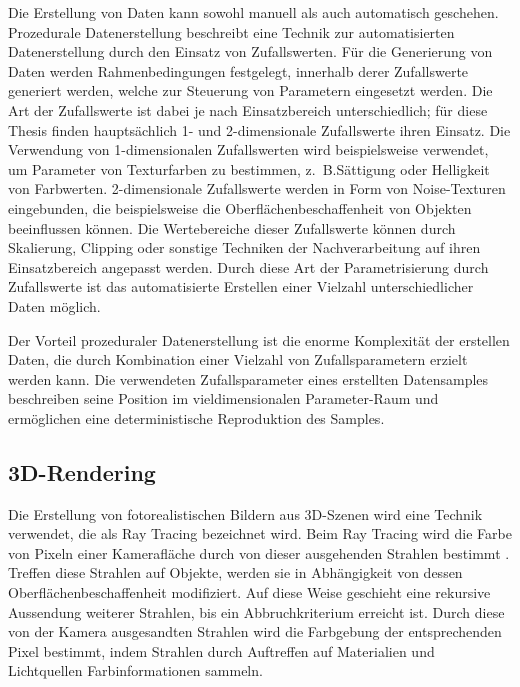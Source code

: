 Die Erstellung von Daten kann sowohl manuell als auch automatisch geschehen. Prozedurale Datenerstellung beschreibt eine Technik zur automatisierten Datenerstellung durch den Einsatz von Zufallswerten. Für die Generierung von Daten werden Rahmenbedingungen festgelegt, innerhalb derer Zufallswerte generiert werden, welche zur Steuerung von Parametern eingesetzt werden. Die Art der Zufallswerte ist dabei je nach Einsatzbereich unterschiedlich; für diese Thesis finden hauptsächlich 1- und 2-dimensionale Zufallswerte ihren Einsatz. Die Verwendung von 1-dimensionalen Zufallswerten wird beispielsweise verwendet, um Parameter von Texturfarben zu bestimmen, z.~B.Sättigung oder Helligkeit von Farbwerten. 2-dimensionale Zufallswerte werden in Form von Noise-Texturen eingebunden, die beispielsweise die Oberflächenbeschaffenheit von Objekten beeinflussen können. Die Wertebereiche dieser Zufallswerte können durch Skalierung, Clipping oder sonstige Techniken der Nachverarbeitung auf ihren Einsatzbereich angepasst werden. Durch diese Art der Parametrisierung durch Zufallswerte ist das automatisierte Erstellen einer Vielzahl unterschiedlicher Daten möglich.

Der Vorteil prozeduraler Datenerstellung ist die enorme Komplexität der erstellen Daten, die durch Kombination einer Vielzahl von Zufallsparametern erzielt werden kann. Die verwendeten Zufallsparameter eines erstellten Datensamples beschreiben seine Position im vieldimensionalen Parameter-Raum und ermöglichen eine deterministische Reproduktion des Samples.



\subsection{3D-Rendering}
\label{sec:3d_rendering}

Die Erstellung von fotorealistischen Bildern aus 3D-Szenen wird eine Technik verwendet, die als Ray Tracing bezeichnet wird. Beim Ray Tracing wird die Farbe von Pixeln einer Kamerafläche durch von dieser ausgehenden Strahlen bestimmt \cite{ray_tracing,ray_tracing_distributed,ray_tracing_equations}. Treffen diese Strahlen auf Objekte, werden sie in Abhängigkeit von dessen Oberflächenbeschaffenheit modifiziert. Auf diese Weise geschieht eine rekursive Aussendung weiterer Strahlen, bis ein Abbruchkriterium erreicht ist. Durch diese von der Kamera ausgesandten Strahlen wird die Farbgebung der entsprechenden Pixel bestimmt, indem Strahlen durch Auftreffen auf Materialien und Lichtquellen Farbinformationen sammeln.


